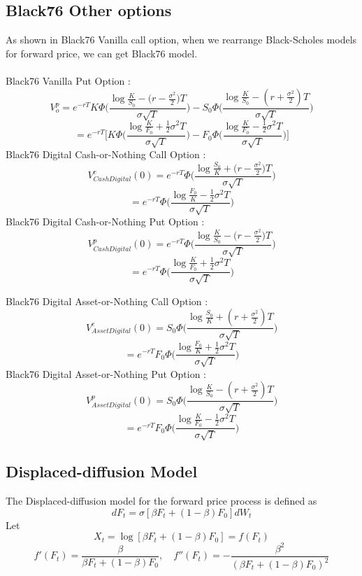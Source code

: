 \documentclass{article}
\begin{document}
\subsection{Black76 Other options}
As shown in Black76 Vanilla call option, when we rearrange Black-Scholes models for forward price, we can get Black76 model.
\\
\\
Black76 Vanilla Put Option :
$$
V_o^{p} = e^{-rT}K\Phi\Bigg(\frac{\log{\frac{K}{S_0}}-\big(r-\frac{\sigma^{2}}{2}\big)T}{\sigma\sqrt{T}}\Bigg) - S_0\Phi\Bigg(\frac{\log{\frac{K}{S_0}}-(r+\frac{\sigma^{2}}{2})T}{\sigma\sqrt{T}}\Bigg)
$$
$$
= e^{-rT}\Bigg[K\Phi\Bigg(\frac{\log{\frac{K}{F_0}}+\frac{1}{2}\sigma^{2}T}{\sigma\sqrt{T}}\Bigg) - F_0\Phi\Bigg(\frac{\log{\frac{K}{F_0}}-\frac{1}{2}\sigma^{2}T}{\sigma\sqrt{T}}\Bigg)\Bigg]
$$
Black76 Digital Cash-or-Nothing Call Option :
$$
V^{c}_{Cash Digital}(0) = e^{-rT}\Phi\Bigg(\frac{\log{\frac{S_0}{K}}+\big(r-\frac{\sigma^{2}}{2}\big)T}{\sigma\sqrt{T}} \Bigg)
$$
$$
= e^{-rT}\Phi\Bigg(\frac{\log{\frac{F_0}{K}}-\frac{1}{2}\sigma^{2}T}{\sigma\sqrt{T}} \Bigg)
$$
Black76 Digital Cash-or-Nothing Put Option :
$$
V^{p}_{Cash Digital}(0) = e^{-rT}\Phi\Bigg( \frac{\log{\frac{K}{S_0}}-\big(r-\frac{\sigma^{2}}{2}\big)T}{\sigma\sqrt{T}} \Bigg)
$$
$$
= e^{-rT}\Phi\Bigg(\frac{\log{\frac{K}{F_0}}+\frac{1}{2}\sigma^{2}T}{\sigma\sqrt{T}} \Bigg)
$$

Black76 Digital Asset-or-Nothing Call Option :
$$
V^{c}_{Asset Digital}(0) = S_0\Phi\Bigg(\frac{\log{\frac{S_0}{K}}+(r+\frac{\sigma^{2}}{2})T}{\sigma\sqrt{T}} \Bigg)
$$
$$
= e^{-rT}F_0\Phi\Bigg(\frac{\log{\frac{F_0}{K}}+\frac{1}{2}\sigma^{2}T}{\sigma\sqrt{T}}\Bigg)
$$
Black76 Digital Asset-or-Nothing Put Option :
$$
V^{p}_{Asset Digital}(0) =
S_0\Phi\Bigg(\frac{\log{\frac{K}{S_0}}-(r+\frac{\sigma^{2}}{2})T}{\sigma\sqrt{T}}\Bigg)
$$
$$
= e^{-rT}F_0\Phi\Bigg(\frac{\log{\frac{K}{F_0}}-\frac{1}{2}\sigma^{2}T}{\sigma\sqrt{T}}\Bigg)
$$

\subsection{Displaced-diffusion Model}
The Displaced-diffusion model for the forward price process is defined as
$$
dF_t = \sigma [\beta F_t + (1-\beta)F_0]dW_t
$$
Let $$X_t = \log[\beta F_t+(1-\beta)F_0] = f(F_t)$$
$$ f'(F_t) = \frac{\beta}{\beta F_t+(1-\beta ) F_0},\quad f''(F_t) = -\frac{\beta^{2}}{(\beta F_t+(1-\beta) F_0)^{2}} $$
\end{document}
